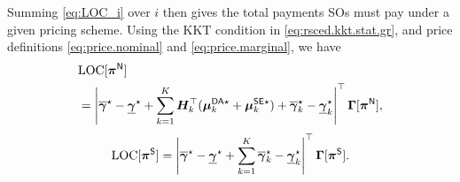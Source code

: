 
Summing \eqref{eq:LOC_i} over $i$ then gives the total \LOC{} payments SOs must pay under a given pricing scheme. Using the KKT condition in \eqref{eq:rsced.kkt.stat.gr}, and price definitions \eqref{eq:price.nominal} and \eqref{eq:price.marginal}, we have 
{\small
\begin{equation}\label{eq:loc_pi_N}
    \begin{split}
        &{\rm LOC}{}[{\bm{\pi}}^{{\sf N}}]\\
        &= \left| \overline{{\bm{\gamma}}}^{\star} - \underline{{\bm{\gamma}}}^{\star} + \sum_{k = 1}^K {\bm{H}}_k^\top ({\bm{\mu}}_k^{{\sf DA}{}\star} + {\bm{\mu}}_k^{{\sf SE}{}\star}) + \overline{{\bm{\gamma}}}^{\star}_k - \underline{{\bm{\gamma}}}^{\star}_k \right|^\top {\bm{\Gamma}}[{\bm{\pi}}^{{\sf N}}],
    \end{split}
\end{equation}
\begin{equation}\label{eq:loc_pi_S}
    {\rm LOC}{}[{\bm{\pi}}^{{\sf S}}]=\left| \overline{{\bm{\gamma}}}^{\star} - \underline{{\bm{\gamma}}}^{\star} + \sum_{k = 1}^K \overline{{\bm{\gamma}}}^{\star}_k - \underline{{\bm{\gamma}}}^{\star}_k \right|^\top {\bm{\Gamma}}[{\bm{\pi}}^{{\sf S}}].
\end{equation}
}
